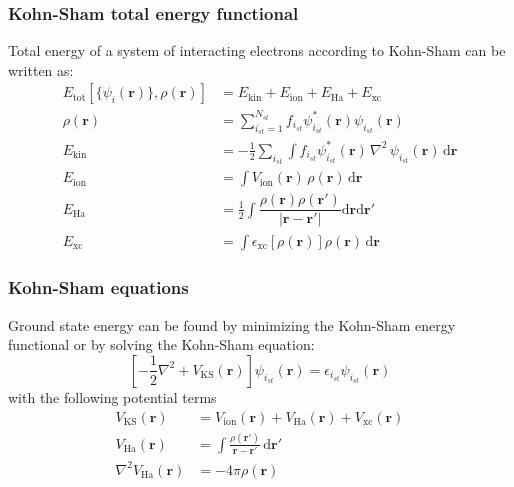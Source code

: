 \documentclass[10pt]{beamer}
\begin{document}
\begin{frame}
\frametitle{Kohn-Sham total energy functional}

Total energy of a system of interacting electrons according to Kohn-Sham
can be written as:
\begin{align*}
E_{\mathrm{tot}}\left[\{\psi_{i}(\mathbf{r})\},\rho(\mathbf{r})\right] & =
E_{\mathrm{kin}} + E_{\mathrm{ion}} + E_{\mathrm{Ha}} + E_{\mathrm{xc}} \\
%
\rho(\mathbf{r}) & = \sum_{i_{st} = 1}^{N_{st}} f_{i_{st}} \psi^{*}_{i_{st}}(\mathbf{r})
\psi_{i_{st}}(\mathbf{r}) \\
%
E_{\mathrm{kin}} & = -\frac{1}{2}\sum_{i_{st}}
\int f_{i_{st}}
\psi_{i_{st}}^{*}(\mathbf{r})\,\nabla^2\,\psi_{i_{st}}(\mathbf{r})
\,\mathrm{d}\mathbf{r} \\
%
E_{\mathrm{ion}} & = \int V_{\mathrm{ion}}(\mathbf{r})\, \rho(\mathbf{r})\,
\mathrm{d}\mathbf{r} \\
%
E_{\mathrm{Ha}} & = \frac{1}{2} \int 
\dfrac{\rho(\mathbf{r})\rho(\mathbf{r}')}
{\left|\mathbf{r} - \mathbf{r}'\right|}
\mathrm{d}\mathbf{r}\mathrm{d}\mathbf{r}' \\
%
E_{\mathrm{xc}} & = \int \epsilon_{\mathrm{xc}}\left[\rho(\mathbf{r})\right]
\rho(\mathbf{r})\,\mathrm{d}\mathbf{r}
\end{align*}

\end{frame}


\begin{frame}
\frametitle{Kohn-Sham equations}

Ground state energy can be found by minimizing the Kohn-Sham energy functional or
by solving the Kohn-Sham equation:
\begin{equation}
\left[
-\frac{1}{2}\nabla^2  + V_{\mathrm{KS}}(\mathbf{r})
\right] \psi_{i_{st}}(\mathbf{r}) =
\epsilon_{i_{st}}\psi_{i_{st}}(\mathbf{r})
\end{equation}
with the following potential terms
\begin{align*}
V_{\mathrm{KS}}(\mathbf{r}) & = V_{\mathrm{ion}}(\mathbf{r}) + V_{\mathrm{Ha}}(\mathbf{r})
+ V_{\mathrm{xc}}(\mathbf{r}) \\
%
V_{\mathrm{Ha}}(\mathbf{r}) & = \int
\frac{\rho(\mathbf{r}')}
{\mathbf{r} - \mathbf{r}'}\,\mathrm{d}\mathbf{r}' \\
%
\nabla^{2} V_{\mathrm{Ha}}(\mathbf{r}) & = -4\pi \rho(\mathbf{r})
\end{align*}


\end{frame}
\end{document}
